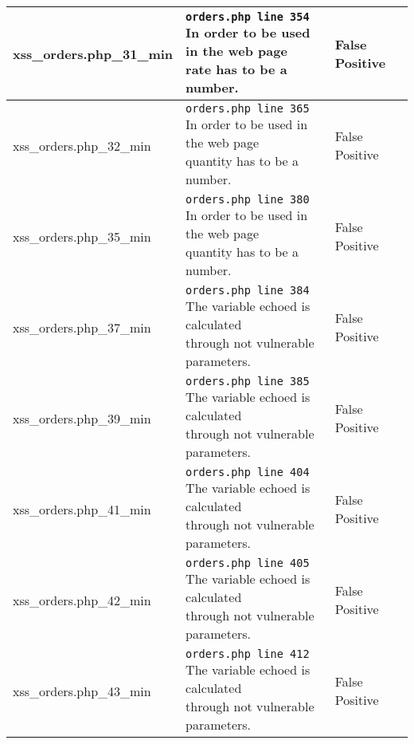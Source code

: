 \documentclass[11pt]{article}
\begin{document}
\begin{longtable}[H]{| p{} | p{} | p{} |}
	 	\hline
	  	xss\_orders.php\_31\_min 	
	  	& \makecell{ \texttt{orders.php line 354} \\
				 In order to be used in the web page\\
				 rate has to be a number.}  
	 	& False Positive \\

	 	\hline
	  	xss\_orders.php\_32\_min 	
	  	& \makecell{ \texttt{orders.php line 365} \\
				 In order to be used in the web page\\
				 quantity has to be a number.}  
	 	& False Positive \\

	 	\hline
	  	xss\_orders.php\_35\_min 	
	  	& \makecell{ \texttt{orders.php line 380} \\
				 In order to be used in the web page\\
				 quantity has to be a number.}  
	 	& False Positive \\


	 	\hline
	  	xss\_orders.php\_37\_min 	
	  	& \makecell{ \texttt{orders.php line 384} \\
				 The variable echoed is calculated \\
				 through not vulnerable parameters.}  
	 	& False Positive \\


	 	\hline
	  	xss\_orders.php\_39\_min 	
	  	& \makecell{ \texttt{orders.php line 385} \\
				The variable echoed is calculated \\
				through not vulnerable parameters.}  
	 	& False Positive \\


	 	\hline
	  	xss\_orders.php\_41\_min 	
	  	& \makecell{ \texttt{orders.php line 404} \\
				 The variable echoed is calculated \\
				through not vulnerable parameters.}  
	 	& False Positive \\


	 	\hline
	  	xss\_orders.php\_42\_min 	
	  	& \makecell{ \texttt{orders.php line 405} \\
				The variable echoed is calculated \\
				through not vulnerable parameters.}
	 	& False Positive \\


	 	\hline
	  	xss\_orders.php\_43\_min 	
	  	& \makecell{ \texttt{orders.php line 412} \\
				 The variable echoed is calculated \\
				through not vulnerable parameters.}
	 	& False Positive \\



\end{longtable}
\end{document}
